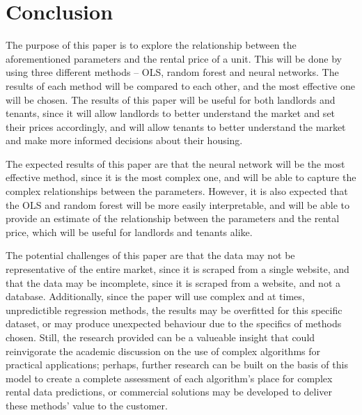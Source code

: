 \documentclass[12pt]{report}
\begin{document}
\section{Conclusion}
The purpose of this paper is to explore the relationship between the aforementioned parameters and the rental price of a unit. This will be done by using three different methods -- OLS, random forest and neural networks. The results of each method will be compared to each other, and the most effective one will be chosen. The results of this paper will be useful for both landlords and tenants, since it will allow landlords to better understand the market and set their prices accordingly, and will allow tenants to better understand the market and make more informed decisions about their housing.

The expected results of this paper are that the neural network will be the most effective method, since it is the most complex one, and will be able to capture the complex relationships between the parameters. However, it is also expected that the OLS and random forest will be more easily interpretable, and will be able to provide an estimate of the relationship between the parameters and the rental price, which will be useful for landlords and tenants alike.

The potential challenges of this paper are that the data may not be representative of the entire market, since it is scraped from a single website, and that the data may be incomplete, since it is scraped from a website, and not a database. Additionally, since the paper will use complex and at times, unpredictible regression methods, the results may be overfitted for this specific dataset, or may produce unexpected behaviour due to the specifics of methods chosen. Still, the research provided can be a valueable insight that could reinvigorate the academic discussion on the use of complex algorithms for practical applications; perhaps, further research can be built on the basis of this model to create a complete assessment of each algorithm's place for complex rental data predictions, or commercial solutions may be developed to deliver these methods' value to the customer.

\printbibliography
\end{document}
